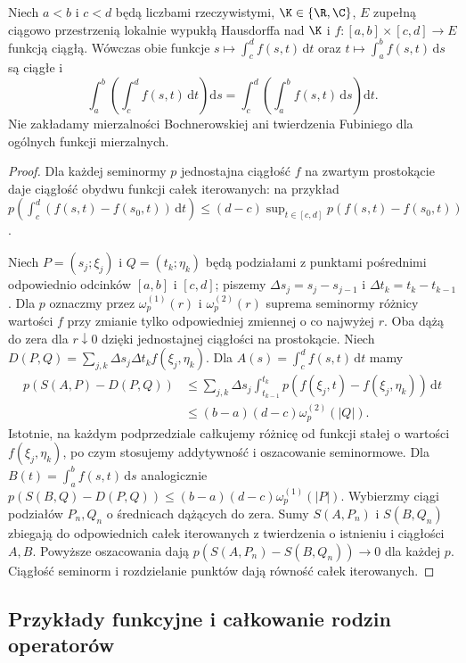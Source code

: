 \begin{twierdzenie}
\label{thm:fubini-continuous15a}
Niech $a<b$ i $c<d$ będą liczbami rzeczywistymi,
$\K\in\{\R,\C\}$, $E$ zupełną ciągowo przestrzenią
lokalnie wypukłą Hausdorffa nad $\K$ i
$f:[a,b]\times[c,d]\to E$ funkcją ciągłą. Wówczas obie funkcje
$s\mapsto\int_c^d f(s,t)\,\mathrm dt$ oraz
$t\mapsto\int_a^b f(s,t)\,\mathrm ds$ są ciągłe i
\[
 \int_a^b\left(\int_c^d f(s,t)\,\mathrm dt\right)\mathrm ds
 =\int_c^d\left(\int_a^b f(s,t)\,\mathrm ds\right)\mathrm dt.
\]
Nie zakładamy mierzalności Bochnerowskiej ani twierdzenia Fubiniego
dla ogólnych funkcji mierzalnych.
\end{twierdzenie}
\begin{proof}
Dla każdej seminormy $p$ jednostajna ciągłość $f$
na zwartym prostokącie daje ciągłość obydwu funkcji
całek iterowanych: na przykład
$p(\int_c^d(f(s,t)-f(s_0,t))\,\mathrm dt)
\le(d-c)\sup_{t\in[c,d]}p(f(s,t)-f(s_0,t))$.

Niech $P=(s_j;\xi_j)$ i $Q=(t_k;\eta_k)$ będą podziałami
z punktami pośrednimi odpowiednio odcinków $[a,b]$ i $[c,d]$;
piszemy $\Delta s_j=s_j-s_{j-1}$ i $\Delta t_k=t_k-t_{k-1}$.
Dla $p$ oznaczmy przez $\omega_p^{(1)}(r)$ i $\omega_p^{(2)}(r)$
suprema seminormy różnicy wartości $f$ przy zmianie tylko
odpowiedniej zmiennej o co najwyżej $r$.
Oba dążą do zera dla $r\downarrow0$ dzięki jednostajnej
ciągłości na prostokącie. Niech
$D(P,Q)=\sum_{j,k}\Delta s_j\Delta t_k f(\xi_j,\eta_k)$.
Dla $A(s)=\int_c^d f(s,t)\,\mathrm dt$ mamy
\[
\begin{split}
 p(S(A,P)-D(P,Q))
 &\le\sum_{j,k}\Delta s_j
 \int_{t_{k-1}}^{t_k}p(f(\xi_j,t)-f(\xi_j,\eta_k))\,\mathrm dt\\
 &\le(b-a)(d-c)\omega_p^{(2)}(|Q|).
\end{split}
\]
Istotnie, na każdym podprzedziale całkujemy różnicę
od funkcji stałej o wartości $f(\xi_j,\eta_k)$, po czym
stosujemy addytywność i oszacowanie seminormowe.
Dla $B(t)=\int_a^b f(s,t)\,\mathrm ds$ analogicznie
$p(S(B,Q)-D(P,Q))\le(b-a)(d-c)\omega_p^{(1)}(|P|)$.
Wybierzmy ciągi podziałów $P_n,Q_n$ o średnicach dążących
do zera. Sumy $S(A,P_n)$ i $S(B,Q_n)$ zbiegają do
odpowiednich całek iterowanych z twierdzenia o istnieniu
i ciągłości $A,B$. Powyższe oszacowania dają
$p(S(A,P_n)-S(B,Q_n))\to0$ dla każdej $p$.
Ciągłość seminorm i rozdzielanie punktów dają równość
całek iterowanych.
\end{proof}

\subsection{Przykłady funkcyjne i całkowanie rodzin operatorów}

